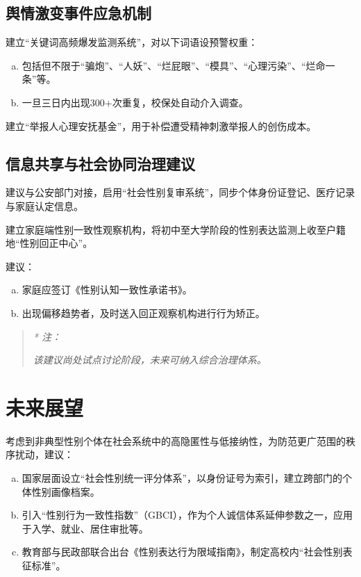 \documentclass[]{ctexrep}
\begin{document}
	\section{舆情激变事件应急机制}
	建立“关键词高频爆发监测系统”，对以下词语设预警权重：
	\begin{enumerate}[a.]
		\item 包括但不限于“骗炮”、“人妖”、“烂屁眼”、“模具”、“心理污染”、“烂命一条”等。
		
		\item 一旦三日内出现300+次重复，校保处自动介入调查。
	\end{enumerate}
	建立“举报人心理安抚基金”，用于补偿遭受精神刺激举报人的创伤成本。
	\section{信息共享与社会协同治理建议}	 
	建议与公安部门对接，启用“社会性别复审系统”，同步个体身份证登记、医疗记录与家庭认定信息。
	
	建立家庭端性别一致性观察机构，将初中至大学阶段的性别表达监测上收至户籍地“性别回正中心”。
	
	建议：
	\begin{enumerate}[a.]
		\item 家庭应签订《性别认知一致性承诺书》。
		
		\item 出现偏移趋势者，及时送入回正观察机构进行行为矫正。
	\end{enumerate}
	\begin{quotation}
		\textit{\hspace{-4em} * 注：}
	
		\textit{该建议尚处试点讨论阶段，未来可纳入综合治理体系。}
	\end{quotation}
	\chapter{未来展望}
	考虑到非典型性别个体在社会系统中的高隐匿性与低接纳性，为防范更广范围的秩序扰动，建议：
	\begin{enumerate}[a.]
		\item 国家层面设立“社会性别统一评分体系”，以身份证号为索引，建立跨部门的个体性别画像档案。
		
		\item 引入“性别行为一致性指数”（GBCI），作为个人诚信体系延伸参数之一，应用于入学、就业、居住审批等。
		
		\item 教育部与民政部联合出台《性别表达行为限域指南》，制定高校内“社会性别表征标准”。
	\end{enumerate}
	
\end{document}
